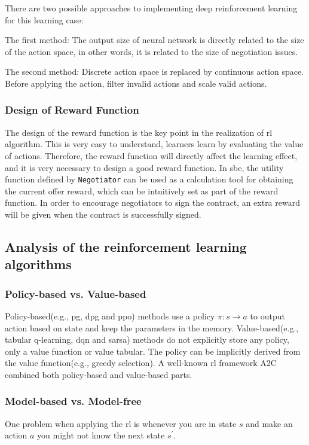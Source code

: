 There are two possible approaches to implementing deep reinforcement learning for this learning case:

The first method: The output size of neural network is directly related to the size of the action space, in other words, it is related to the size of negotiation issues. 

The second method: Discrete action space is replaced by continuous action space. Before applying the action, filter invalid actions and scale valid actions.

\subsubsection{Design of Reward Function}
The design of the reward function is the key point in the realization of \gls{rl} algorithm. This is very easy to understand, learners learn by evaluating the value of actions. Therefore, the reward function will directly affect the learning effect, and it is very necessary to design a good reward function. In \gls{sbe}, the utility function defined by \texttt{Negotiator} can be used as a calculation tool for obtaining the current offer reward, which can be intuitively set as part of the reward function. In order to encourage negotiators to sign the contract, an extra reward will be given when the contract is successfully signed. 

\subsection{Analysis of the reinforcement learning algorithms}
\subsubsection{Policy-based vs. Value-based}
Policy-based(e.g., \gls{pg}, \gls{dpg} and \gls{ppo}) methods use a policy $\pi:s \to a$ to output action based on state and keep the parameters in the memory. Value-based(e.g., tabular q-learning, \gls{dqn} and \gls{sarsa}) methods do not explicitly store any policy, only a value function or value tabular. The policy can be implicitly derived from the value function(e.g., greedy selection). A well-known \gls{rl} framework A2C combined both policy-based and value-based parts.

\subsubsection{Model-based vs. Model-free}
One problem when applying the \gls{rl} is whenever you are in state $s$ and make an action $a$ you might not know the next state $s^{\prime}$.

